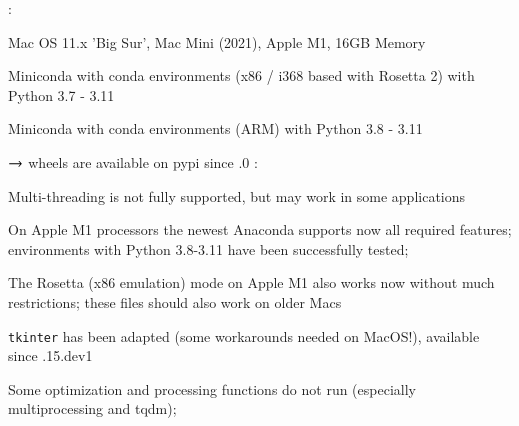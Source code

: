 \noindent {}:
\bi
  \item Mac OS 11.x 'Big Sur', Mac Mini (2021), Apple M1, 16GB Memory
  \item Miniconda with conda environments (x86 / i368 based with Rosetta 2) with Python 3.7 - 3.11
  \item Miniconda with conda environments (ARM) with Python 3.8 - 3.11
  \item[] $\rightarrow$ wheels are available on pypi since .0 
\ei
\noindent {}:
\bi
  \item Multi-threading is not fully supported, but may work in some applications
  \item On Apple M1 processors the newest Anaconda supports now all required features; environments with Python 3.8-3.11 have been successfully tested;
  \item The Rosetta (x86 emulation) mode on Apple M1 also works now without much restrictions; these files should also work on older Macs
  \item \texttt{tkinter} has been adapted (some workarounds needed on MacOS!), available since .15.dev1
  \item Some optimization and processing functions do not run (especially multiprocessing and tqdm); 
\ei

